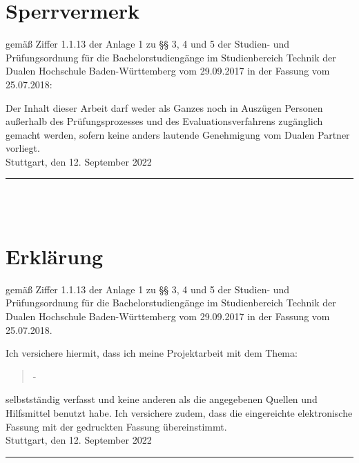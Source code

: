 \chapter*{Sperrvermerk} %
gemäß Ziffer 1.1.13 der Anlage 1 zu §§ 3, 4 und 5  der Studien- und Prüfungsordnung für die Bachelorstudiengänge im Studienbereich Technik der Dualen Hochschule Baden-Württemberg vom 29.09.2017 in der Fassung vom 25.07.2018:

Der Inhalt dieser Arbeit darf weder als Ganzes noch in Auszügen Personen außerhalb des Prüfungsprozesses und des Evaluationsverfahrens zugänglich gemacht werden, sofern keine anders lautende Genehmigung vom Dualen Partner vorliegt.\\[6ex]

Stuttgart, den 12. September 2022 \\[1ex]

\rule[-0.2cm]{5cm}{0.5pt} \\

\textsc{\autor} \\[10ex]

\chapter*{Erklärung} %

gemäß Ziffer 1.1.13 der Anlage 1 zu §§ 3, 4 und 5  der Studien- und Prüfungsordnung für die Bachelorstudiengänge im Studienbereich Technik der Dualen Hochschule Baden-Württemberg vom 29.09.2017 in der Fassung vom 25.07.2018.

Ich versichere hiermit, dass ich meine Projektarbeit mit dem Thema:

\begin{quote}
	\textit{\titel} -\textit{ \untertitel }
\end{quote}

selbstständig verfasst und keine anderen als die angegebenen Quellen und Hilfsmittel benutzt habe. Ich versichere zudem, dass die eingereichte elektronische Fassung mit der gedruckten Fassung übereinstimmt.\\[6ex]

Stuttgart, den 12. September 2022 \\[1ex]

\rule[-0.2cm]{5cm}{0.5pt} \\

\textsc{\autor} \\[10ex]

\rmfamily

\thispagestyle{empty}

\cleardoublepage

